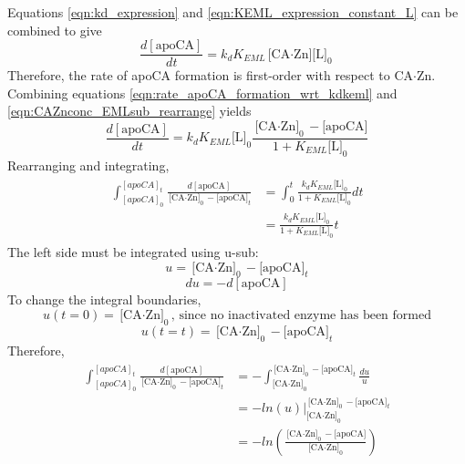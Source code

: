Equations \eqref{eqn:kd_expression} and \eqref{eqn:KEML_expression_constant_L} can be combined to give
\begin{equation}\label{eqn:rate_apoCA_formation_wrt_kdkeml}
\frac{d[\text{apoCA}]}{dt}=k_{d}K_{EML}\text{[CA$\cdot$Zn][L]}_0
\end{equation}
Therefore, the rate of apoCA formation is first-order with respect to CA$\cdot$Zn. Combining equations \eqref{eqn:rate_apoCA_formation_wrt_kdkeml} and \eqref{eqn:CAZnconc_EMLsub_rearrange} yields
\begin{equation}\label{eqn:preintegration}
\frac{d[\text{apoCA}]}{dt}=k_{d}K_{EML}\text{[L]}_0\frac{\text{[CA$\cdot$Zn]}_0 - \text{[apoCA]}}{1+K_{EML}\text{[L]}_0}
\end{equation}
Rearranging and integrating,
\begin{align}\label{eqn:kdkeml_integral}
\begin{split}
\int_{[apoCA]_0}^{[apoCA]_t} \frac{d[\text{apoCA}]}{\text{[CA$\cdot$Zn]}_0 - \text{[apoCA]}_t} &= \int_0^t \frac{k_{d}K_{EML}\text{[L]}_0}{1+K_{EML}\text{[L]}_0}dt \\
&= \frac{k_{d}K_{EML}\text{[L]}_0}{1+K_{EML}\text{[L]}_0}t
\end{split}
\end{align}
The left side must be integrated using u-sub:
\begin{equation*}
u=\text{[CA$\cdot$Zn]}_0 - \text{[apoCA]}_t
\end{equation*}
\begin{equation*}
du=-d[\text{apoCA}]
\end{equation*}
To change the integral boundaries,
\begin{equation*}
u(t=0)=\text{[CA$\cdot$Zn]}_0\text{, since no inactivated enzyme has been formed}
\end{equation*}
\begin{equation*}
u(t=t)=\text{[CA$\cdot$Zn]}_0 - \text{[apoCA]}_t
\end{equation*}
Therefore,
\begin{align}\label{eqn:long_integral}
\begin{split}
\int_{[apoCA]_0}^{[apoCA]_t} \frac{d[\text{apoCA}]}{\text{[CA$\cdot$Zn]}_0 - \text{[apoCA]}_t}
&=
-\int_{\text{[CA$\cdot$Zn]}_0}^{\text{[CA$\cdot$Zn]}_0 - \text{[apoCA]}_t} \frac{du}{u} \\
&=
-ln(u) \Big|_{\text{[CA$\cdot$Zn]}_0}^{\text{[CA$\cdot$Zn]}_0 - \text{[apoCA]}_t} \\
&= -ln \left( \frac{\text{[CA$\cdot$Zn]}_0 - \text{[apoCA]}}{\text{[CA$\cdot$Zn]}_0} \right)
\end{split}
\end{align}

